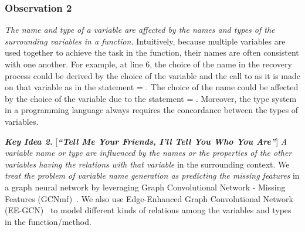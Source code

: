 \subsubsection*{\bf Observation 2}
{\em The name and type of a variable are affected by the names and
  types of the surrounding variables in a function.}  Intuitively,
because multiple variables are used together to achieve the task in
the function, their names are often consistent with one another. For
example, at line 6, the choice of the name  in the
recovery process could be derived
by the choice of the variable  and the call to
 as it is made on that variable as in the statement
 = . The choice of the name
 could be affected by the choice of the
variable  due to the statement  =
. Moreover, the type system in a programming
language always requires the concordance between the types of
variables.


\vspace{2pt}
{\bf \em Key Idea 2.} [{\bf {\em ``Tell Me Your Friends, I'll Tell
    You Who You Are''}}]
{\em A variable name or type are influenced by the
  names or the properties of the other variables having the relations
  with that variable} in the surrounding context. We {\em treat the
  problem of variable name generation as predicting the missing
  features} in a graph neural network by leveraging Graph Convolutional
Network - Missing Features (GCNmf)~\cite{GCNmf}.  We also use
Edge-Enhanced Graph Convolutional Network (EE-GCN)~\cite{ee-gcn} to
model different kinds of relations among the
variables and types in the function/method.



\vspace{-2pt}
